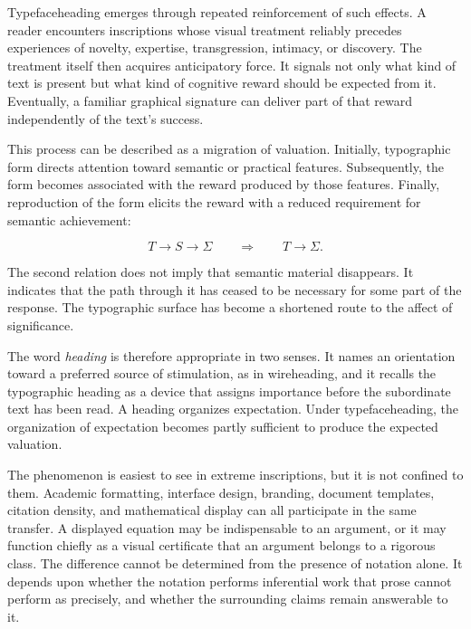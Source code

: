 \documentclass[11pt]{article}
\newcommand{\term}[1]{\emph{#1}}
\begin{document}
Typefaceheading emerges through repeated reinforcement of such effects. A
reader encounters inscriptions whose visual treatment reliably precedes
experiences of novelty, expertise, transgression, intimacy, or discovery.
The treatment itself then acquires anticipatory force. It signals not only
what kind of text is present but what kind of cognitive reward should be
expected from it. Eventually, a familiar graphical signature can deliver part
of that reward independently of the text's success.

This process can be described as a migration of valuation. Initially,
typographic form directs attention toward semantic or practical features.
Subsequently, the form becomes associated with the reward produced by those
features. Finally, reproduction of the form elicits the reward with a reduced
requirement for semantic achievement:

\begin{equation}
  T \rightarrow S \rightarrow \Sigma
  \qquad\Longrightarrow\qquad
  T \rightarrow \Sigma.
  \label{eq:typographic-short-circuit}
\end{equation}

The second relation does not imply that semantic material disappears. It
indicates that the path through it has ceased to be necessary for some part
of the response. The typographic surface has become a shortened route to the
affect of significance.

The word \term{heading} is therefore appropriate in two senses. It names an
orientation toward a preferred source of stimulation, as in wireheading, and
it recalls the typographic heading as a device that assigns importance before
the subordinate text has been read. A heading organizes expectation. Under
typefaceheading, the organization of expectation becomes partly sufficient
to produce the expected valuation.

The phenomenon is easiest to see in extreme inscriptions, but it is not
confined to them. Academic formatting, interface design, branding, document
templates, citation density, and mathematical display can all participate in
the same transfer. A displayed equation may be indispensable to an argument,
or it may function chiefly as a visual certificate that an argument belongs
to a rigorous class. The difference cannot be determined from the presence
of notation alone. It depends upon whether the notation performs inferential
work that prose cannot perform as precisely, and whether the surrounding
claims remain answerable to it.
\end{document}

